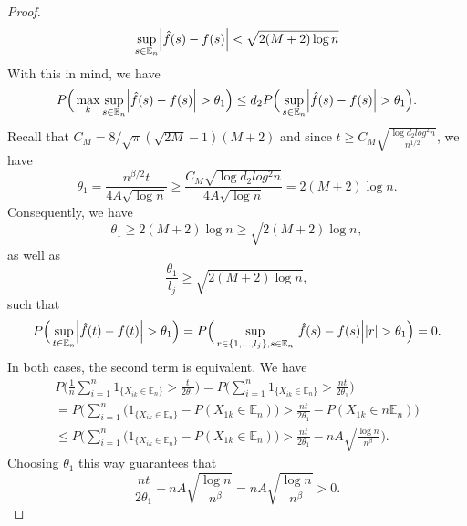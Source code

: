 \begin{lemma}
\begin{proof}
\begin{equation}
            \sup_{s \in \mathbb{E}_n}\abs{\hat{f}(s) - f(s)} < \sqrt{2 (M + 2) \log n}
        \end{equation}
        With this in mind, we have
        \begin{equation*}
            P\Big(\max_k \sup_{s \in \mathbb{E}_n} \abs{\hat{f}(s) - f(s)} > \theta_1 \Big) \leq d_2 P\Big(\sup_{s \in \mathbb{E}_n} \abs{\hat{f}(s) - f(s)} > \theta_1 \Big).
        \end{equation*}
        Recall that $C_M = 8/\sqrt{\pi}(\sqrt{2M} -1)(M+2)$ and since $t \geq C_M\sqrt{\frac{\log d_2 log^2 n}{n^{1/2}}}$, we have
        \begin{equation*}
            \theta_1 = \frac{n^{\beta/2}t}{4A\sqrt{\log n}} \geq \frac{C_M \sqrt{\log d_2 log^2 n}}{4A\sqrt{\log n}} = 2(M + 2)\log n.
        \end{equation*}
        Consequently, we have
        \begin{equation*}
            \theta_1 \geq 2(M + 2)\log n \geq \sqrt{2(M + 2)\log n},
        \end{equation*}
        as well as
        \begin{equation*}
            \frac{\theta_1}{l_{j}} \geq \sqrt{2(M + 2)\log n},
        \end{equation*}
        such that
        \begin{equation*}
            P\Big(\sup_{t \in \mathbb{E}_n} \abs{\hat{f}(t) - f(t)} > \theta_1 \Big) = P\Big(\sup_{r \in \{1,\dots,l_{j}\}, s \in \mathbb{E}_n} \abs{\hat{f}(s) - f(s)}\abs{r} > \theta_1 \Big) = 0.
        \end{equation*}
        In both cases, the second term is equivalent. We have
        \begin{multline*}
            P\Big(\frac{1}{n} \sum_{i = 1}^n 1_{\{X_{ik} \in \mathbb{E}_n\}} > \frac{t}{2\theta_1}\Big) = P\Big(\sum_{i = 1}^n 1_{\{X_{ik} \in \mathbb{E}_n\}} > \frac{nt}{2\theta_1}\Big) \\
            = P\Big(\sum_{i = 1}^n\big(1_{\{X_{ik} \in \mathbb{E}_n\}} - P(X_{1k} \in \mathbb{E}_n)\big) > \frac{nt}{2\theta_1} - P(X_{1k} \in n\mathbb{E}_n)\Big) \\
            \leq P\Big(\sum_{i = 1}^n\big(1_{\{X_{ik} \in \mathbb{E}_n\}} - P(X_{1k} \in \mathbb{E}_n)\big) > \frac{nt}{2\theta_1} - nA\sqrt{\frac{\log n}{n^\beta}}\Big).
        \end{multline*}
        Choosing $\theta_1$ this way guarantees that
        \begin{equation*}
            \frac{nt}{2\theta_1} - nA\sqrt{\frac{\log n}{n^\beta}} = nA\sqrt{\frac{\log n}{n^\beta}} > 0.

\end{equation*}
\end{proof}
\end{lemma}
